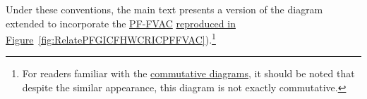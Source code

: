 \documentclass[\econtexRoot/BufferStockTheory]{subfiles}
\newcommand{\BSTlinkTo}{https://\owner.github.io/BufferStockTheory}
\renewcommand{\PFFVAC}{\href{{\BSTlinkTo}\#PFFVAC}{\textrm{PF-FVAC}}}
\begin{document}

Under these conventions, the main text presents a version of the diagram extended to incorporate the {\PFFVAC} \href{https://econ-ark.github.io/BufferStockTheory/#RelatePFGICFHWCRICPFFVAC}{reproduced in Figure}~\ref{fig:RelatePFGICFHWCRICPFFVAC}).\footnote{For readers familiar with the \href{https://en.wikipedia.org/wiki/Commutative_diagram}{commutative diagrams}, it should be noted that despite the similar appearance, this diagram is not exactly commutative.}%

\providecommand{\figName}{RelatePFGICFHWCRICPFFVAC} %
\providecommand{\figFile}{\figName} %
\hypertarget{\figFile-App}{}
\end{document}
